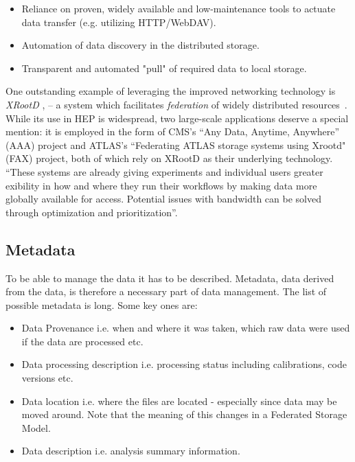 \begin{itemize}
	\item Reliance on proven, widely available and low-maintenance tools to actuate data transfer (e.g. utilizing HTTP/WebDAV).
	\item Automation of data discovery in the distributed storage.
	\item Transparent and automated "pull" of required data to local storage.
\end{itemize}

One outstanding example of leveraging the improved networking technology is \textit{XRootD}
\cite{xrootd}, \cite{xrootd_web} -- a system which facilitates \textit{federation} of widely 
distributed resources~\cite{xrootd_fed,xrootd_snowmass}. While its use in HEP is widespread, two large-scale applications deserve a special mention: 
it is employed  in the form of CMS's ``Any Data, Anytime, Anywhere'' (AAA)
project and ATLAS's ``Federating ATLAS storage systems using Xrootd" (FAX) project, both of which rely
on XRootD as their underlying technology. ``These systems are already giving experiments and
individual users greater exibility in how and where they run their workflows by making data more globally
available for access. Potential issues with bandwidth can be solved through optimization and prioritization''\cite{xrootd_snowmass}.


\subsection{Metadata}
To be able to manage the data it has to be described. Metadata, data derived from the data, is therefore a necessary part of data management. The 
list of possible metadata is long. Some key ones are:

\begin{itemize}
\item Data Provenance i.e. when and where it was taken, which raw data were used if the data are processed etc.
\item Data processing description i.e. processing status including calibrations, code versions etc.
\item Data location i.e. where the files are located - especially since data may be moved around. Note that the meaning of this changes in a 
Federated Storage Model. 
\item Data description i.e. analysis summary information.
\end{itemize}




